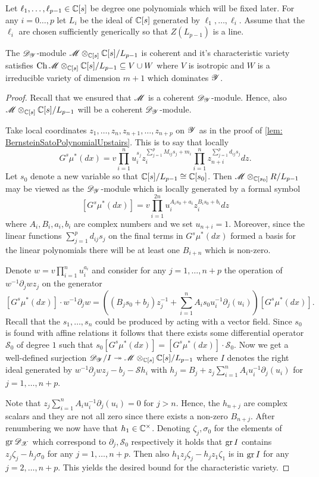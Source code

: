Let $\ell_1,\ldots,\ell_{p-1}\in \mathbb{C}[s]$ be degree one polynomials which will be fixed later.
For any $i=0\ldots,p$ let $L_i$ be the ideal of $\mathbb{C}[s]$ generated by $\ell_1,\ldots,\ell_i$.
Assume that the $\ell_i$ are chosen sufficiently generically so that $Z(L_{p-1})$ is a line.
\begin{lemma}\label{lem: CharVarEstimateW}
  The $\mathscr{D}_{\mathscr{Y}}$-module $\mathscr{M}\otimes_{\mathbb{C}[s]}\mathbb{C}[s]/L_{p-1}$ is coherent and it's characteristic variety satisfies $\operatorname{Ch}\mathscr{M}\otimes_{\mathbb{C}[s]}\mathbb{C}[s]/L_{p-1} \subseteq V \cup W $ where $V$ is isotropic and $W$ is a irreducible variety of dimension $m +1$ which dominates $\mathscr{Y}$.
\end{lemma}
\begin{proof}
  Recall that we ensured that $\mathscr{M}$ is a coherent $\mathscr{D}_{\mathscr{Y}}$-module.
  Hence, also $\mathscr{M}\otimes_{\mathbb{C}[s]}\mathbb{C}[s]/L_{p-1}$ will be a coherent $\mathscr{D}_{\mathscr{Y}}$-module.

  Take local coordinates $z_1,\ldots,z_n,z_{n+1},\ldots,z_{n+p}$ on $\mathscr{Y}$ as in the proof of \cref{lem: BernsteinSatoPolynomialUpstairs}.
  This is to say that locally
  $$G^s \mu^*(dx) = v \prod_{i=1}^nu_i^{s_j}z_i^{\sum_{j=1}^p M_{ij}s_j + m_i}\prod_{i=1}^n z_{n+i}^{\sum_{j=1}^p d_{ij}s_j} dz.$$
  Let $s_0$ denote a new variable so that $\mathbb{C}[s]/L_{p-1}\cong \mathbb{C}[s_0]$.
  Then $\mathscr{M}\otimes_{\mathbb{C}[s_0]}R/L_{p-1}$ may be viewed as the $\mathscr{D}_{\mathscr{Y}}$-module which is locally generated by a formal symbol
  $$[G^s \mu^*(dx)] =v \prod_{i=1}^{2n} u_i^{A_i s_0 + a_i}z_i^{B_i s_0 + b_i} dz $$
  where $A_i,B_i,a_i,b_i$ are complex numbers and we set $u_{n+i}=1$.
  Moreover, since the linear functions $\sum_{j=1}^p d_{ij}s_j$ on the final terms in $G^s\mu^*(dx)$ formed a basis for the linear polynomials there will be at least one $B_{i+n}$ which is non-zero.

  Denote $w = v\prod_{i=1}^n u_i^{a_i}$ and consider for any $j=1,\ldots,n+p$ the operation of $w^{-1}\partial_j wz_j$ on the generator
  $$[G^s \mu^*(dx)]\cdot w^{-1}\partial_j w =((B_j s_0 + b_j)z_j^{-1} + \sum_{i=1}^{n} A_i s_0 u_i^{-1}\partial_j(u_i) )[G^s \mu^*(dx)].$$
  Recall that the $s_1,\ldots,s_n$ could be produced by acting with a vector field.
  Since $s_0$ is found with affine relations it follows that there exists some differential operator $\mathcal{S}_0$ of degree $1$ such that $s_0 [G^s \mu^*(dx)] = [G^s \mu^*(dx)]\cdot \mathcal{S}_0$.
  Now we get a well-defined surjection $\mathscr{D}_{\mathscr{Y}}/I \twoheadrightarrow \mathscr{M}\otimes_{\mathbb{C}[s]}\mathbb{C}[s]/L_{p-1}$ where $I$ denotes the right ideal generated by $w^{-1}\partial_j wz_j - b_j - \mathcal{S} h_i$ with $h_j = B_j + z_j\sum_{i=1}^n A_iu_i^{-1}\partial_j(u_i)$ for $j=1,\ldots, n+p$.

  Note that $ z_j\sum_{i=1}^n A_iu_i^{-1}\partial_j(u_i) = 0$ for $j>n$.
  Hence, the $h_{n+j}$ are complex scalars and they are not all zero since there exists a non-zero $B_{n+j}$.
  After renumbering we now have that $h_1 \in \mathbb{C}^\times$.
  Denoting $\zeta_j, \sigma_0$ for the elements of $\operatorname{gr} \mathscr{D}_{\mathscr{X}}$ which correspond to $\partial_j, \mathcal{S}_0$ respectively it holds that $\operatorname{gr} I$ contains $z_j \zeta_j - h_j \sigma_0$ for any $j=1,\ldots, n+p$.
  Then also $h_1z_j \zeta_j - h_jz_1 \zeta_1$ is in $\operatorname{gr} I$ for any $j=2,\ldots, n+p$.
  This yields the desired bound for the characteristic variety.
\end{proof}
